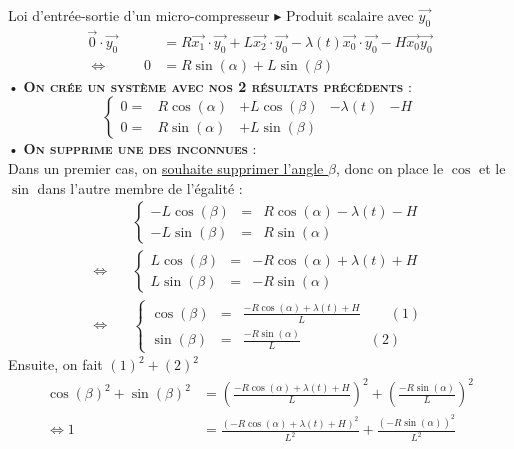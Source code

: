 \documentclass{article} %
\begin{document}
{\begin{exemple}{Loi d'entrée-sortie d'un micro-compresseur}
$\blacktriangleright$ Produit scalaire avec $\overrightarrow{y_0}$
\begin{align*}
 \overrightarrow{0}\cdot\overrightarrow{y_0}&=R\overrightarrow{x_1}\cdot\overrightarrow{y_0}+L\overrightarrow{x_2}\cdot\overrightarrow{y_0}-\lambda(t)\overrightarrow{x_0}\cdot\overrightarrow{y_0}-H\overrightarrow{x_0}\overrightarrow{y_0}\\
\Leftrightarrow\hspace{30pt}0 &=R\sin(\alpha)+L\sin(\beta)
\end{align*}
• \textsc{\textbf{On crée un système avec nos 2 résultats précédents}} :\\
$$\left\{\begin{matrix}
0=&R\cos(\alpha)&+L\cos(\beta)&-\lambda(t)&-H \\
0 =& R\sin(\alpha)&+L\sin(\beta)&
\end{matrix}\right.$$
• \textsc{\textbf{On supprime une des inconnues}} :\\
Dans un premier cas, on \underline{souhaite supprimer l'angle $\beta$}, donc on place le $\cos$ et le $\sin$ dans l'autre membre de l'égalité :
\begin{align*}
 &\left\{
 \begin{array}{rcl}
 -L\cos(\beta) &=& R\cos(\alpha) - \lambda(t) - H \\
 -L\sin(\beta) &=& R\sin(\alpha)
 \end{array}
 \right.
\\
\Leftrightarrow\quad
&\left\{
 \begin{array}{rcl}
 L\cos(\beta) &=& -R\cos(\alpha) + \lambda(t) + H \\
 L\sin(\beta) &=& -R\sin(\alpha)
 \end{array}
 \right.
\\
\Leftrightarrow\quad
&\left\{
 \begin{array}{rcl}
 \cos(\beta) &=& \frac{-R\cos(\alpha) + \lambda(t) + H}{L} \hspace{25pt}(1) \\
 \sin(\beta) &=& \frac{-R\sin(\alpha)}{L} \hspace{59pt}(2)
 \end{array}
 \right.
\end{align*}
Ensuite, on fait $(1)^2+(2)^2$
\begin{align*}
 \cos(\beta)^2+\sin(\beta)^2 &= \left( \frac{-R\cos(\alpha) + \lambda(t) + H}{L}\right)^2+\left(\frac{-R\sin(\alpha)}{L} \right)^2\\
\Leftrightarrow 1&= \frac{\left(-R\cos(\alpha) + \lambda(t) + H\right)^2}{L^2}+\frac{\left(-R\sin(\alpha)\right)^2}{L^2} \\

\end{align*}
\end{exemple}}
\end{document}
